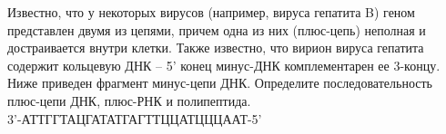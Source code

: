 Известно, что у некоторых вирусов (например, вируса гепатита B) геном представлен двумя из цепями, причем одна из них (плюс-цепь) неполная и достраивается внутри клетки. Также известно, что вирион вируса гепатита содержит кольцевую ДНК -- 5' конец минус-ДНК комплементарен ее 3-концу.
Ниже приведен фрагмент минус-цепи ДНК. Определите последовательность плюс-цепи ДНК, плюс-РНК и полипептида.\\
3'-АТТГГТАЦГАТАТГАГТТЦЦАТЦЦЦААТ-5'